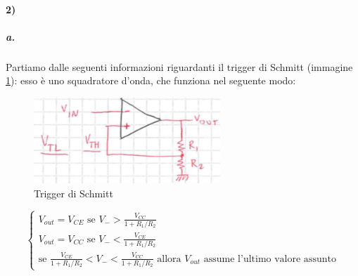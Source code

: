 \documentclass{article}
\begin{document}
	\paragraph{2)}
	\subparagraph{a.}
		Partiamo dalle seguenti informazioni riguardanti il trigger di Schmitt (immagine \ref{fig:smith}): esso è uno squadratore d'onda, che funziona nel seguente modo:\newline
		\begin{figure}
			\centering
			\includegraphics[width=70mm]{immagini/smitha.png}
			\caption{Trigger di Schmitt}
			\label{fig:smith}
		\end{figure}
		\begin{equation}
			\begin{cases}
				V_{out}=V_{CE}\textrm{ se }V_->\frac{V_{CC}}{1+R_1/R_2}\\
				V_{out}=V_{CC}\textrm{ se }V_-<\frac{V_{CE}}{1+R_1/R_2}\\
				\textrm{se }\frac{V_{CE}}{1+R_1/R_2}<V_-<\frac{V_{CC}}{1+R_1/R_2}\textrm{ allora }V_{out}\textrm{ assume l'ultimo valore assunto}
			\end{cases}
		\end{equation}
\end{document}
